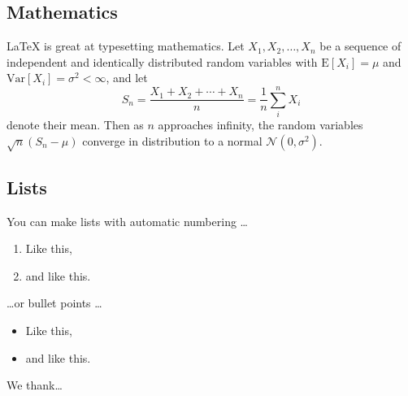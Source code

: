 \documentclass[twocolumn,showpacs,%
  nofootinbib,aps,superscriptaddress,%
  eqsecnum,prd,notitlepage,showkeys,10pt]{revtex4-1}
\begin{document}
\subsection{Mathematics}

\LaTeX{} is great at typesetting mathematics. Let $X_1, X_2, \ldots, X_n$ be a sequence of independent and identically distributed random variables with $\text{E}[X_i] = \mu$ and $\text{Var}[X_i] = \sigma^2 < \infty$, and let
$$S_n = \frac{X_1 + X_2 + \cdots + X_n}{n}
      = \frac{1}{n}\sum_{i}^{n} X_i$$
denote their mean. Then as $n$ approaches infinity, the random variables $\sqrt{n}(S_n - \mu)$ converge in distribution to a normal $\mathcal{N}(0, \sigma^2)$.

\subsection{Lists}

You can make lists with automatic numbering \dots

\begin{enumerate}
\item Like this,
\item and like this.
\end{enumerate}
\dots or bullet points \dots
\begin{itemize}
\item Like this,
\item and like this.
\end{itemize}

\begin{acknowledgments}

We thank\dots

\end{acknowledgments}
\end{document}
